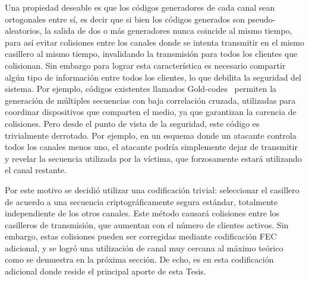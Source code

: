 Una propiedad deseable es que los códigos generadores de cada canal sean ortogonales entre sí, es decir que si bien los códigos generados son pseudo-aleatorios, la salida de dos o más generadores nunca coincide al mismo tiempo, para así evitar colisiones entre los canales donde se intenta transmitir en el mismo casillero al mismo tiempo, invalidando la transmisión para todos los clientes que colisionan.
Sin embargo para lograr esta característica es necesario compartir algún tipo de información entre todos los clientes, lo que debilita la seguridad del sistema. Por ejemplo, códigos existentes llamados Gold-codes~\cite{gold1967optimal} permiten la generación de múltiples secuencias con baja correlación cruzada, utilizadas para coordinar dispositivos que comparten el medio, ya que garantizan la carencia de colisiones. Pero desde el punto de vista de la seguridad, este código es trivialmente derrotado. Por ejemplo, en un esquema donde un atacante controla todos los canales menos uno, el atacante podría simplemente dejar de transmitir y revelar la secuencia utilizada por la víctima, que forzosamente estará utilizando el canal restante.

Por este motivo se decidió utilizar una codificación trivial: seleccionar el casillero de acuerdo a una secuencia criptográficamente segura estándar, totalmente independiente de los otros canales. Este método causará colisiones entre los casilleros de transmisión, que aumentan con el número de clientes activos. Sin embargo, estas colisiones pueden ser corregidas mediante codificación FEC adicional, y se logró una utilización de canal muy cercana al máximo teórico como se demuestra en la próxima sección. De echo, es en esta codificación adicional donde reside el principal aporte de esta Tesis.

